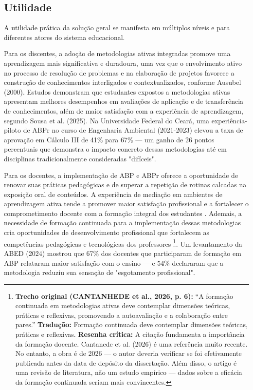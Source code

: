 \subsection{Utilidade}
\label{subsec:jg_utilidade}

A utilidade prática da solução geral se manifesta em múltiplos níveis e para diferentes atores do sistema educacional.

Para os discentes, a adoção de metodologias ativas integradas promove uma aprendizagem mais significativa e duradoura, uma vez que o envolvimento ativo no processo de resolução de problemas e na elaboração de projetos favorece a construção de conhecimentos interligados e contextualizados, conforme Ausubel (2000). Estudos demonstram que estudantes expostos a metodologias ativas apresentam melhores desempenhos em avaliações de aplicação e de transferência de conhecimentos, além de maior satisfação com a experiência de aprendizagem, segundo Sousa et al. (2025). Na Universidade Federal do Ceará, uma experiência-piloto de ABPr no curso de Engenharia Ambiental (2021-2023) elevou a taxa de aprovação em Cálculo III de 41\% para 67\% — um ganho de 26 pontos percentuais que demonstra o impacto concreto dessas metodologias até em disciplinas tradicionalmente consideradas "difíceis".

Para os docentes, a implementação de ABP e ABPr oferece a oportunidade de renovar suas práticas pedagógicas e de superar a repetição de rotinas calcadas na exposição oral de conteúdos. A experiência de mediação em ambientes de aprendizagem ativa tende a promover maior satisfação profissional e a fortalecer o comprometimento docente com a formação integral dos estudantes \cite{MIRANDA2022}. Ademais, a necessidade de formação continuada para a implementação dessas metodologias cria oportunidades de desenvolvimento profissional que fortalecem as competências pedagógicas e tecnológicas dos professores \cite{CANTANHEDE2026}\footnote{\textbf{Trecho original (CANTANHEDE et al., 2026, p. 6):} ``A formação continuada em metodologias ativas deve contemplar dimensões teóricas, práticas e reflexivas, promovendo a autoavaliação e a colaboração entre pares.'' \textbf{Tradução:} Formação continuada deve contemplar dimensões teóricas, práticas e reflexivas. \textbf{Resenha crítica:} A citação fundamenta a importância da formação docente. Cantanede et al. (2026) é uma referência muito recente. No entanto, a obra é de 2026 — o autor deveria verificar se foi efetivamente publicada antes da data de depósito da dissertação. Além disso, o artigo é uma revisão de literatura, não um estudo empírico — dados sobre a eficácia da formação continuada seriam mais convincentes.}. Um levantamento da ABED (2024) mostrou que 67\% dos docentes que participaram de formação em ABP relataram maior satisfação com o ensino — e 54\% declararam que a metodologia reduziu sua sensação de "esgotamento profissional".

